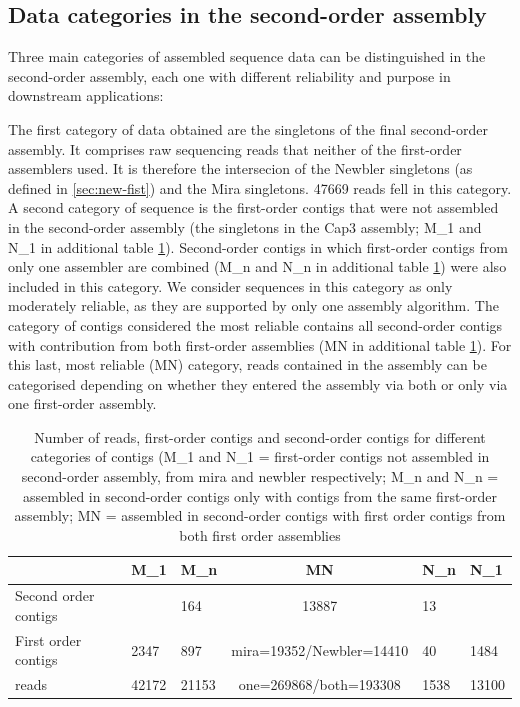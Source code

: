 \documentclass[12pt,a4paper]{article}
\begin{document}
\newpage
\subsection{Data categories in the second-order assembly}
\label{sec:data-categ-second}

Three main categories of assembled sequence data can be distinguished
in the second-order assembly, each one with different reliability and
purpose in downstream applications:

The first category of data obtained are the singletons of the final
second-order assembly. It comprises raw sequencing reads that neither
of the first-order assemblers used. It is therefore the intersecion of
the Newbler singletons (as defined in \ref{sec:new-fist}) and the Mira
singletons. 47669 reads fell in this category. A
second category of sequence is the first-order contigs that were not
assembled in the second-order assembly (the singletons in the Cap3
assembly; M\_1 and N\_1 in additional table
\ref{tab:categ}). Second-order contigs in which first-order contigs
from only one assembler are combined (M\_n and N\_n in additional
table \ref{tab:categ}) were also included in this category. We
consider sequences in this category as only moderately reliable, as
they are supported by only one assembly algorithm. The category of
contigs considered the most reliable contains all second-order contigs
with contribution from both first-order assemblies (MN in additional
table \ref{tab:categ}). For this last, most reliable (MN) category,
reads contained in the assembly can be categorised depending on
whether they entered the assembly via both or only via one first-order
assembly.

\begin{table}[ht]
\begin{center}
\begin{tabular}{p{2.5cm}llcll}
  \hline
 & M\_1 & M\_n & MN & N\_n & N\_1 \\ 
  \hline
Second order contigs &   & 164 & 13887 & 13 &   \\ 
  First order contigs & 2347 & 897 & mira=19352/Newbler=14410 & 40 & 1484 \\ 
  reads & 42172 & 21153 & one=269868/both=193308 & 1538 & 13100 \\ 
   \hline
\end{tabular}
\caption[Number of reads, first-order contigs and second-order contigs for different categories of contigs]{Number of reads, first-order contigs and second-order contigs for different categories of contigs (M\_1 and N\_1 = first-order contigs not assembled in second-order assembly, from mira and newbler respectively; M\_n and N\_n =  assembled in second-order contigs only with contigs from the same first-order assembly; MN = assembled in second-order contigs with first order contigs from both first order assemblies}
\label{tab:categ}
\end{center}
\end{table}
\newpage
\end{document}

